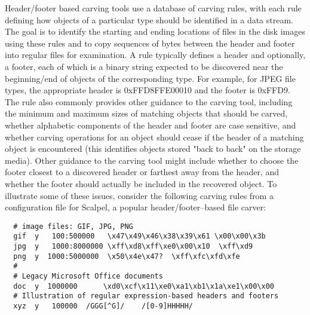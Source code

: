 Header/footer based carving tools use a database of carving rules, with each rule defining how objects of a particular type should be identified in a data stream.  The goal is to identify the starting and ending locations of files in the disk images using these rules and to copy sequences of bytes between the header and footer into regular files for examination.  A rule typically defines a header and optionally, a footer, each of which is a binary string expected to be discovered near the beginning/end of objects of the corresponding type.  For example, for JPEG file types, the appropriate header is 0xFFD8FFE00010 and the footer is 0xFFD9.  The rule also commonly provides other guidance to the carving tool, including the minimum and maximum sizes of matching objects that should be carved, whether alphabetic components of the header and footer are case sensitive, and whether carving operations for an object should cease if the header of a matching object is encountered (this identifies objects stored "back to back" on the storage media).  Other guidance to the carving tool might include whether to choose the footer closest to a discovered header or farthest away from the header, and whether the footer should actually be included in the recovered object.  To illustrate some of these issues, consider the following carving rules from a configuration file for Scalpel, a popular header/footer--based file carver:

{
\medium
\begin{Verbatim}
  # image files: GIF, JPG, PNG
  gif  y   100:500000   \x47\x49\x46\x38\x39\x61 \x00\x00\x3b
  jpg  y   1000:8000000 \xff\xd8\xff\xe0\x00\x10  \xff\xd9
  png  y  1000:5000000  \x50\x4e\x47?  \xff\xfc\xfd\xfe
  #
  # Legacy Microsoft Office documents
  doc  y  1000000      \xd0\xcf\x11\xe0\xa1\xb1\x1a\xe1\x00\x00 
  # Illustration of regular expression-based headers and footers
  xyz  y   100000  /GGG[^G]/    /[0-9]HHHHH/
\end{Verbatim}
}

